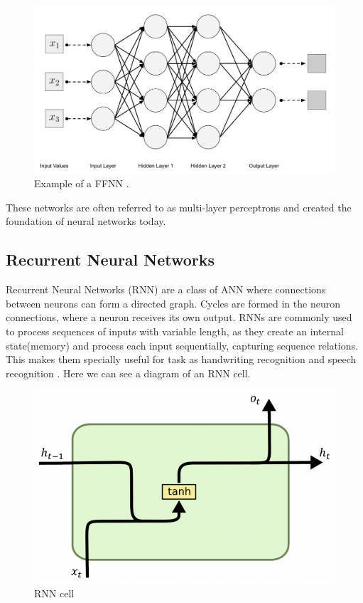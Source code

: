 \documentclass{tex_files/kththesis}
\begin{document}
\begin{figure}[H]
    \centering
    \includegraphics[width=0.6\linewidth]{images/background/fnn.png}
    \caption{Example of a FFNN \cite{ffnn}.}
    \label{FFNN}
\end{figure}

These networks are often referred to as multi-layer perceptrons and created the foundation of neural networks today.

\subsection{Recurrent Neural Networks}

Recurrent Neural Networks (RNN) are a class of ANN where connections between neurons can form a directed graph. Cycles are formed in the neuron connections, where a neuron receives its own output. RNNs are commonly used to process sequences of inputs with variable length, as they create an internal state(memory) and process each input sequentially, capturing sequence relations. This makes them specially useful for task as handwriting recognition \cite{rnn-hand} and speech recognition \cite{rnn-speech}. Here we can see a diagram of an RNN cell.

\begin{figure}[H]
    \centering
    \includegraphics[width=\textwidth]{images/background/RNN_core.png}
    \caption{RNN cell \cite{daniel}}
    \label{RNN}
\end{figure}
\end{document}
